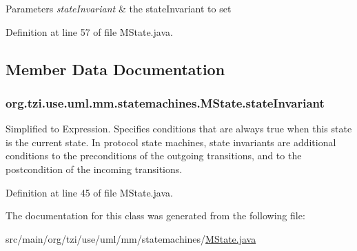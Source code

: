 \begin{DoxyParams}{Parameters}
{\em state\-Invariant} & the state\-Invariant to set \\
\hline
\end{DoxyParams}


Definition at line 57 of file M\-State.\-java.



\subsection{Member Data Documentation}
\hypertarget{classorg_1_1tzi_1_1use_1_1uml_1_1mm_1_1statemachines_1_1_m_state_a775770f5d4a9f30a5cf59a77f11aa5d6}{
\subsubsection[{state\-Invariant}]{ org.\-tzi.\-use.\-uml.\-mm.\-statemachines.\-M\-State.\-state\-Invariant\hspace{0.3cm}{\ttfamily [protected]}}}\label{classorg_1_1tzi_1_1use_1_1uml_1_1mm_1_1statemachines_1_1_m_state_a775770f5d4a9f30a5cf59a77f11aa5d6}
Simplified to Expression. Specifies conditions that are always true when this state is the current state. In protocol state machines, state invariants are additional conditions to the preconditions of the outgoing transitions, and to the postcondition of the incoming transitions. 

Definition at line 45 of file M\-State.\-java.



The documentation for this class was generated from the following file\-:\begin{DoxyCompactItemize}
\item 
src/main/org/tzi/use/uml/mm/statemachines/\hyperlink{_m_state_8java}{M\-State.\-java}\end{DoxyCompactItemize}
